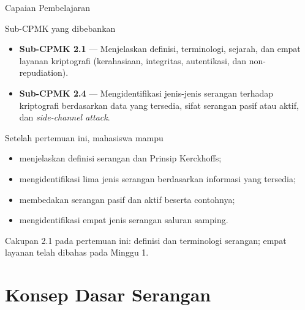 \documentclass[aspectratio=169,11pt]{beamer}
\begin{document}
\begin{frame}{Capaian Pembelajaran}
    \footnotesize
    \begin{block}{Sub-CPMK yang dibebankan}
        \begin{itemize}
            \item \textbf{Sub-CPMK 2.1} --- Menjelaskan definisi, terminologi,
                  sejarah, dan empat layanan kriptografi (kerahasiaan, integritas,
                  autentikasi, dan non-repudiation).
            \item \textbf{Sub-CPMK 2.4} --- Mengidentifikasi jenis-jenis serangan
                  terhadap kriptografi berdasarkan data yang tersedia, sifat
                  serangan pasif atau aktif, dan \textit{side-channel attack}.
        \end{itemize}
    \end{block}
    \vspace{0.2cm}
    \begin{exampleblock}{Setelah pertemuan ini, mahasiswa mampu}
        \begin{itemize}
            \item menjelaskan definisi serangan dan Prinsip Kerckhoffs;
            \item mengidentifikasi lima jenis serangan berdasarkan informasi
                  yang tersedia;
            \item membedakan serangan pasif dan aktif beserta contohnya;
            \item mengidentifikasi empat jenis serangan saluran samping.
        \end{itemize}
    \end{exampleblock}
    \vspace{0.1cm}
    {\scriptsize\textcolor{ubbgray}{Cakupan 2.1 pada pertemuan ini: definisi
    dan terminologi serangan; empat layanan telah dibahas pada Minggu 1.}}
\end{frame}

\section{Konsep Dasar Serangan}
\end{document}

